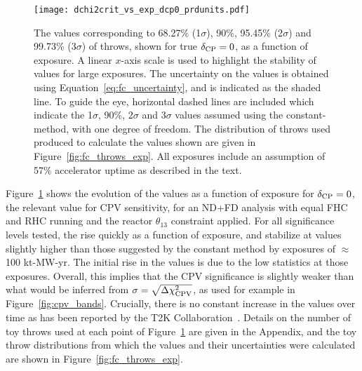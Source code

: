 \begin{figure}[htbp]
  \centering
  \texttt{[image: dchi2crit\_vs\_exp\_dcp0\_prdunits.pdf]}
  \caption{The \dchisqcrit values corresponding to 68.27\% (1$\sigma$), 90\%, 95.45\% (2$\sigma$) and 99.73\% (3$\sigma$) of throws, shown for true $\delta_{\rm CP} = 0$, as a function of exposure. A linear $x$-axis scale is used to highlight the stability of \dchisqcrit values for large exposures. The uncertainty on the \dchisqcrit values is obtained using Equation~\ref{eq:fc_uncertainty}, and is indicated as the shaded line. To guide the eye, horizontal dashed lines are included which indicate the 1$\sigma$, 90\%, 2$\sigma$ and 3$\sigma$ \dchisq values assumed using the constant-\dchisq method, with one degree of freedom. The distribution of throws used produced to calculate the \dchisqcrit values shown are given in Figure~\ref{fig:fc_throws_exp}. All exposures include an assumption of 57\% accelerator uptime as described in the text.}
  \label{fig:fc_vs_exp}
\end{figure}
Figure~\ref{fig:fc_vs_exp} shows the evolution of the \dchisqcrit values as a function of exposure for $\delta_{\rm CP} = 0$, the relevant value for CPV sensitivity, for an ND+FD analysis with equal FHC and RHC running and the reactor $\theta_{13}$ constraint applied.
For all significance levels tested, the \dchisqcrit rise quickly as a function of exposure, and stabilize at values slightly higher than those suggested by the constant \dchisq method by exposures of $\approx$100 kt-MW-yr. The initial rise in the \dchisqcrit values is due to the low statistics at those exposures. Overall, this implies that the CPV significance is slightly weaker than what would be inferred from $\sigma = \sqrt{\Delta\chi^{2}_{\mathrm{CPV}}}$, as used for example in Figure~\ref{fig:cpv_bands}. Crucially, there is no constant increase in the \dchisqcrit values over time as has been reported by the T2K Collaboration~\cite{Abe:2021gky}. Details on the number of toy throws used at each point of Figure~\ref{fig:fc_vs_exp} are given in the Appendix, and the toy throw distributions from which the \dchisqcrit values and their uncertainties were calculated are shown in Figure~\ref{fig:fc_throws_exp}.

